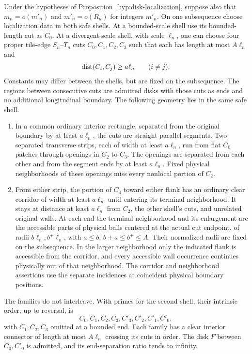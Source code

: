 \begin{lemma}\label{disk:four-cuts}
Under the hypotheses of Proposition~\ref{hyp:disk-localization},
suppose also that $m_n=o(m'_n)$ and $m'_n=o(R_n)$ for integers $m'_n$.
On one subsequence choose localization data in both safe shells.
At a bounded-scale shell use its bounded-length cut as $C_0$.
At a divergent-scale shell, with scale $\ell_n$, one can choose four
proper tile-edge $S_n$--$T_n$ cuts $C_0,C_1,C_2,C_3$ such that each
has length at most $A\ell_n$ and
\[
 \operatorname{dist}(C_i,C_j)\ge a\ell_n\qquad(i\ne j).
\]
Constants may differ between the shells, but are fixed on the
subsequence.  The regions between consecutive cuts are admitted disks
with those cuts as ends and no additional longitudinal boundary.
The following geometry lies in the same safe shell.
\begin{enumerate}[label=\textup{(\roman*)}]
\item In a common ordinary interior rectangle, separated from the
original boundary by at least $a\ell_n$, the cuts are straight parallel
segments.  Two separated transverse strips, each of width at least
$a\ell_n$, run from flat $C_0$ patches through openings in $C_2$ to
$C_3$.  The openings are separated from each other and from the segment
ends by at least $a\ell_n$.  Fixed physical neighborhoods of these
openings miss every nonlocal portion of $C_2$.
\item From either strip, the portion of $C_3$ toward either flank has
an ordinary clear corridor of width at least $a\ell_n$ until entering
its terminal neighborhood.  It stays at distance at least $a\ell_n$
from $C_2$, the other shell's cuts, and unrelated original walls.
At each end the terminal neighborhood and its enlargement are the
accessible parts of physical balls centered at the actual cut endpoint,
of radii $b\ell_n,b^+\ell_n$, with
$a\le b$, $b+a\le b^+\le A$.  Their normalized radii are fixed on the
subsequence.  In the larger neighborhood only the indicated flank is
accessible from the corridor, and every accessible wall occurrence
continues physically out of that neighborhood.  The corridor and
neighborhood assertions use the separate incidences at coincident
physical boundary positions.
\end{enumerate}
The families do not interleave.  With primes for the second shell,
their intrinsic order, up to reversal, is
\[
 C_0,C_1,C_2,C_3,C'_3,C'_2,C'_1,C'_0,
\]
with $C_1,C_2,C_3$ omitted at a bounded end.  Each family has a clear
interior connector of length at most $A\ell_n$ crossing its cuts in
order.  The disk $F$ between $C_0,C'_0$ is admitted, and its end-separation
ratio tends to infinity.
\end{lemma}

